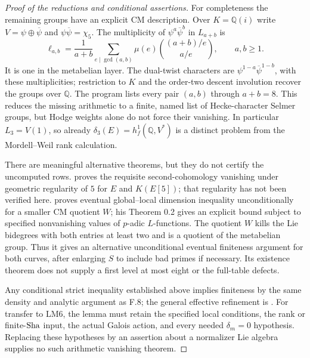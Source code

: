 \begin{proof}[Proof of the reductions and conditional assertions]
For completeness the remaining groups have an explicit CM description.
Over $K=\mathbb Q(i)$ write $V=\psi\oplus\overline\psi$ and
$\psi\overline\psi=\chi_5$. The multiplicity of
$\psi^a\overline\psi^b$ in $L_{a+b}$ is
\[
 \ell_{a,b}=\frac1{a+b}
   \sum_{e\mid\gcd(a,b)}\mu(e)
                  \binom{(a+b)/e}{a/e},\qquad a,b\ge1.
\]
It is one in the metabelian layer. The dual-twist characters are
$\psi^{1-a}\overline\psi^{1-b}$, with these multiplicities;
restriction to $K$ and the order-two descent involution recover the
groups over $\mathbb Q$. The program lists every pair $(a,b)$ through
$a+b=8$. This reduces the missing arithmetic to a finite, named list
of Hecke-character Selmer groups, but Hodge weights alone do not
force their vanishing. In particular $L_3=V(1)$, so already
$\delta_3(E)=h_f^1(\mathbb Q,V^*)$ is a distinct problem from
the Mordell--Weil rank calculation.

There are meaningful alternative theorems, but they do not certify the
uncomputed rows. \citet[Definition 2.2 and Corollary 2.9]{FE_Bars2007}
proves the requisite second-cohomology vanishing under geometric
regularity of $5$ for $E$ and $K(E[5])$; that regularity has not been
verified here. \citet[Theorem 0.1]{FE_Kim2010CM} proves eventual
global--local dimension inequality unconditionally for a smaller CM
quotient $W$; his Theorem 0.2 gives an explicit bound subject to
specified nonvanishing values of $p$-adic $L$-functions. The quotient
$W$ kills the Lie bidegrees with both entries at least two and is a
quotient of the metabelian group. Thus it gives an alternative
unconditional eventual finiteness argument for both curves, after
enlarging $S$ to include bad primes if necessary. Its existence theorem
does not supply a first level at most eight or the full-table defects.

Any conditional strict inequality established above implies finiteness
by the same density and analytic argument as F.8; the general effective
refinement is \citet[Theorem 6.2.1(A),(B), and \S6.3]{FE_Betts2023}.
For transfer to LM6, the lemma must retain the specified local
conditions, the rank or finite-$\mathrm{Sha}$ input, the actual Galois action,
and every needed $\delta_m=0$ hypothesis. Replacing these hypotheses
by an assertion about a normalizer Lie algebra supplies no such
arithmetic vanishing theorem.
\end{proof}
